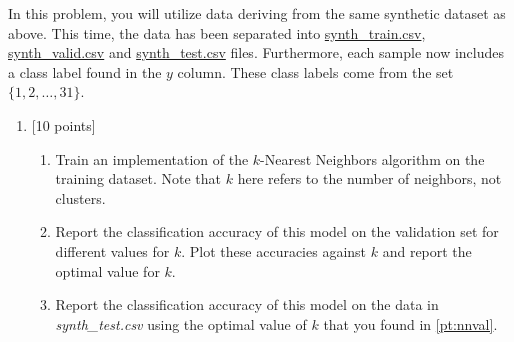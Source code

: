 \documentclass[12pt]{article}
\newenvironment{problem}[2][Problem:]{\begin{trivlist}
\item[\hskip \labelsep {\bfseries #1}\hskip \labelsep {\bfseries #2.}]}{\end{trivlist}}
\begin{document}
\begin{problem}{$K$-NN Classification [10 points]}
In this problem, you will utilize data deriving from the same synthetic dataset as above. 
This time, the data has been separated into \href{https://canvas.dartmouth.edu/files/3128315/download?download_frd=1}{synth\_train.csv}, \href{https://canvas.dartmouth.edu/files/3128316/download?download_frd=1}{synth\_valid.csv} and \href{https://canvas.dartmouth.edu/files/3128314/download?download_frd=1}{synth\_test.csv} files. 
Furthermore, each sample now includes a class label found in the $y$ column. 
These class labels come from the set $\{1, 2, \dots, 31\}$.

\begin{enumerate}
    \item {[10 points]} 
    \begin{enumerate}
    	\item Train an implementation of the $k$-Nearest Neighbors algorithm on the training dataset. Note that $k$ here refers to the number of neighbors, not clusters. 
	\item Report the classification accuracy of this model on the validation set for different values for $k$. Plot these accuracies against $k$ and report the optimal value for $k$. \label{pt:nnval}
	\item Report the classification accuracy of this model on the data in \emph{synth\_test.csv} using the optimal value of $k$ that you found in \ref{pt:nnval}.
    \end{enumerate}
\end{enumerate}
\end{problem}

\pagebreak
\end{document}
